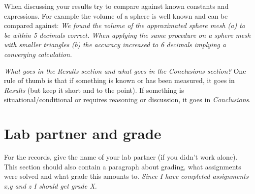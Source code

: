 \documentclass[onecolumn]{article}
\begin{document}
When discussing your results try to compare against known constants and expressions. For example the volume of a sphere is well known and can be compared against: \emph{We found the volume of the approximated sphere mesh (a) to be within 5 decimals correct. When applying the same procedure on a sphere mesh with smaller triangles (b) the accuracy increased to 6 decimals implying a converging calculation.}

\emph{What goes in the Results section and what goes in the Conclusions section?} One rule of thumb is that if something is known or has been measured, it goes in \emph{Results} (but keep it short and to the point). If something is situational/conditional or requires reasoning or discussion, it goes in \emph{Conclusions}.


\section{Lab partner and grade}
For the records, give the name of your lab partner (if you didn't work alone). This section should also contain a paragraph about grading, what assignments were solved and what grade this amounts to. \emph{Since I have completed assignments x,y and z I should get grade X.}

\nocite{*}


\end{document}
